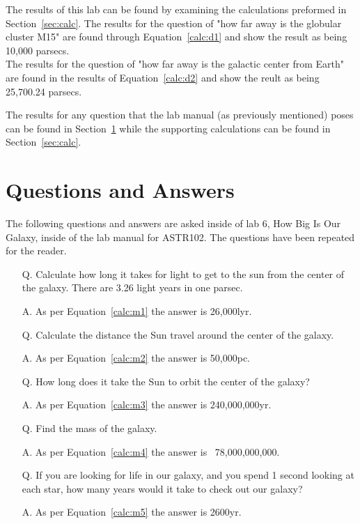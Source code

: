 \documentclass{article}
\begin{document}
The results of this lab can be found by examining the calculations preformed in 
Section~\ref{sec:calc}. The results for the question of "how far away is the globular
cluster M15" are found through Equation~\ref{calc:d1} and show the result as being
10,000 parsecs.\\

The results for the question of "how far away is the galactic center from Earth"
are found in the results of Equation~\ref{calc:d2} and show the reult as being
25,700.24 parsecs.

The results for any question that the lab manual (as previously mentioned) poses
can be found in Section~\ref{sec:qna} while the supporting calculations can be 
found in Section~\ref{sec:calc}.


\section{Questions and Answers}
\label{sec:qna}

The following questions and answers are asked inside of lab 6, How Big Is Our Galaxy,
inside of the lab manual for ASTR102. The questions have been repeated for the reader.

\begin{enumerate}

\item[Q.] Calculate how long it takes for light to get to the sun from the center of
the galaxy. There are 3.26 light years in one parsec.
\item[A.] As per Equation~\ref{calc:m1} the answer is 26,000lyr.
\item[Q.] Calculate the distance the Sun travel around the center of the galaxy.
\item[A.] As per Equation~\ref{calc:m2} the answer is 50,000pc.
\item[Q.] How long does it take the Sun to orbit the center of the galaxy?
\item[A.] As per Equation~\ref{calc:m3} the answer is 240,000,000yr.
\item[Q.] Find the mass of the galaxy.
\item[A.] As per Equation~\ref{calc:m4} the answer is ~78,000,000,000.
\item[Q.] If you are looking for life in our galaxy, and you spend 1 second looking
at each star, how many years would it take to check out our galaxy?
\item[A.] As per Equation~\ref{calc:m5} the answer is 2600yr.

\end{enumerate}
\end{document}
